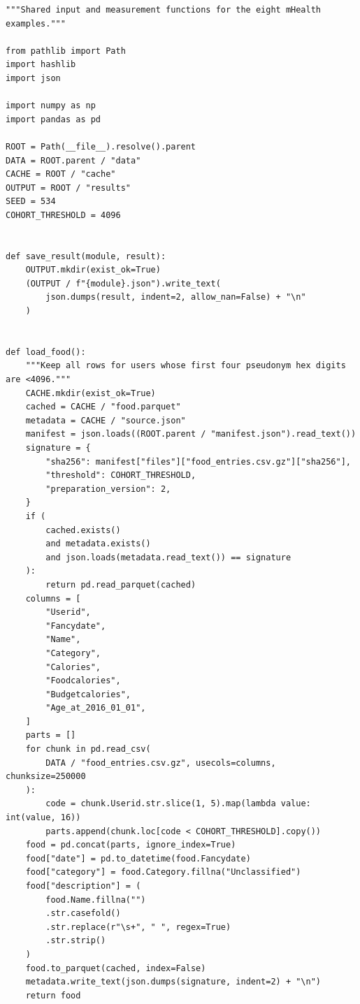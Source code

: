 \begin{Verbatim}[breaklines,breakanywhere,fontsize=\small]
"""Shared input and measurement functions for the eight mHealth examples."""

from pathlib import Path
import hashlib
import json

import numpy as np
import pandas as pd

ROOT = Path(__file__).resolve().parent
DATA = ROOT.parent / "data"
CACHE = ROOT / "cache"
OUTPUT = ROOT / "results"
SEED = 534
COHORT_THRESHOLD = 4096


def save_result(module, result):
    OUTPUT.mkdir(exist_ok=True)
    (OUTPUT / f"{module}.json").write_text(
        json.dumps(result, indent=2, allow_nan=False) + "\n"
    )


def load_food():
    """Keep all rows for users whose first four pseudonym hex digits are <4096."""
    CACHE.mkdir(exist_ok=True)
    cached = CACHE / "food.parquet"
    metadata = CACHE / "source.json"
    manifest = json.loads((ROOT.parent / "manifest.json").read_text())
    signature = {
        "sha256": manifest["files"]["food_entries.csv.gz"]["sha256"],
        "threshold": COHORT_THRESHOLD,
        "preparation_version": 2,
    }
    if (
        cached.exists()
        and metadata.exists()
        and json.loads(metadata.read_text()) == signature
    ):
        return pd.read_parquet(cached)
    columns = [
        "Userid",
        "Fancydate",
        "Name",
        "Category",
        "Calories",
        "Foodcalories",
        "Budgetcalories",
        "Age_at_2016_01_01",
    ]
    parts = []
    for chunk in pd.read_csv(
        DATA / "food_entries.csv.gz", usecols=columns, chunksize=250000
    ):
        code = chunk.Userid.str.slice(1, 5).map(lambda value: int(value, 16))
        parts.append(chunk.loc[code < COHORT_THRESHOLD].copy())
    food = pd.concat(parts, ignore_index=True)
    food["date"] = pd.to_datetime(food.Fancydate)
    food["category"] = food.Category.fillna("Unclassified")
    food["description"] = (
        food.Name.fillna("")
        .str.casefold()
        .str.replace(r"\s+", " ", regex=True)
        .str.strip()
    )
    food.to_parquet(cached, index=False)
    metadata.write_text(json.dumps(signature, indent=2) + "\n")
    return food



\end{Verbatim}
